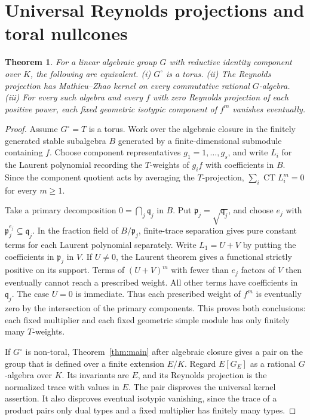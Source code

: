 \documentclass[11pt]{article}
\newtheorem{theorem}{Theorem}[section]
\newcommand{\CT}{\operatorname{CT}}
\begin{document}
\section{Universal Reynolds projections and toral nullcones}

\begin{theorem}\label{thm:universal}
For a linear algebraic group \(G\) with reductive identity component
over \(K\), the following are equivalent.
\textup{(i)} \(G^\circ\) is a torus.
\textup{(ii)} The Reynolds projection has Mathieu--Zhao kernel on every
commutative rational \(G\)-algebra.
\textup{(iii)} For every such algebra and every \(f\) with zero Reynolds
projection of each positive power, each fixed geometric isotypic
component of \(f^m\) vanishes eventually.
\end{theorem}

\begin{proof}
Assume \(G^\circ=T\) is a torus. Work over the algebraic closure
in the finitely generated stable subalgebra \(B\) generated by a
finite-dimensional submodule containing \(f\). Choose component
representatives \(g_1=1,\ldots,g_s\), and write \(L_i\) for the
Laurent polynomial recording the \(T\)-weights of \(g_i f\) with
coefficients in \(B\). Since the component quotient acts by averaging
the \(T\)-projection, \(\sum_i\CT L_i^m=0\) for every \(m\ge1\).

Take a primary decomposition \(0=\bigcap_j\mathfrak q_j\) in \(B\).
Put \(\mathfrak p_j=\sqrt{\mathfrak q_j}\), and choose \(e_j\) with
\(\mathfrak p_j^{e_j}\subseteq\mathfrak q_j\).
In the fraction field of \(B/\mathfrak p_j\), finite-trace separation
\cite[Lemma~7.1]{Complex} gives pure constant terms for each Laurent
polynomial separately. Write \(L_1=U+V\) by putting the coefficients
in \(\mathfrak p_j\) in \(V\). If \(U\ne0\), the Laurent theorem gives
a functional strictly positive on its support. Terms of \((U+V)^m\)
with fewer than \(e_j\) factors of \(V\) then eventually cannot
reach a prescribed weight. All other terms have coefficients in
\(\mathfrak q_j\). The case \(U=0\) is immediate. Thus each prescribed
weight of \(f^m\) is eventually zero by the intersection of the
primary components. This proves both conclusions: each fixed
multiplier and each fixed geometric simple module has only finitely
many \(T\)-weights.

If \(G^\circ\) is non-toral, Theorem~\ref{thm:main} after algebraic
closure gives a pair on the group that is defined over a finite
extension \(E/K\). Regard \(E[G_E]\) as a rational \(G\)-algebra
over \(K\). Its invariants are \(E\), and its Reynolds projection
is the normalized trace with values in \(E\). The pair disproves
the universal kernel assertion. It also disproves eventual isotypic
vanishing, since the trace of a product pairs only dual types and
a fixed multiplier has finitely many types.
\end{proof}
\end{document}
